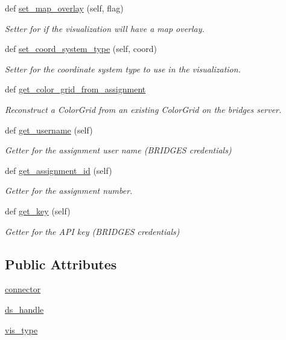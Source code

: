 \begin{DoxyCompactItemize}
def \hyperlink{classbridges_1_1bridges_1_1_bridges_ae9ed34b5878d9d120949da0b7e4d2911}{set\+\_\+map\+\_\+overlay} (self, flag)
\begin{DoxyCompactList}\small\item\em Setter for if the visualization will have a map overlay. \end{DoxyCompactList}\item 
def \hyperlink{classbridges_1_1bridges_1_1_bridges_a6bc905490b1995234f88f47af9aa8a17}{set\+\_\+coord\+\_\+system\+\_\+type} (self, coord)
\begin{DoxyCompactList}\small\item\em Setter for the coordinate system type to use in the visualization. \end{DoxyCompactList}\item 
def \hyperlink{classbridges_1_1bridges_1_1_bridges_a11c2be346fba56589955894c5f84747d}{get\+\_\+color\+\_\+grid\+\_\+from\+\_\+assignment}
\begin{DoxyCompactList}\small\item\em Reconstruct a Color\+Grid from an existing Color\+Grid on the bridges server. \end{DoxyCompactList}\item 
def \hyperlink{classbridges_1_1bridges_1_1_bridges_abf6fdb19db336c2ed14987fdd89d65fe}{get\+\_\+username} (self)
\begin{DoxyCompactList}\small\item\em Getter for the assignment user name (B\+R\+I\+D\+G\+ES credentials) \end{DoxyCompactList}\item 
def \hyperlink{classbridges_1_1bridges_1_1_bridges_a94f39f11368031ad33800aac0bac2f7d}{get\+\_\+assignment\+\_\+id} (self)
\begin{DoxyCompactList}\small\item\em Getter for the assignment number. \end{DoxyCompactList}\item 
def \hyperlink{classbridges_1_1bridges_1_1_bridges_afcdb0291c535b41fb7be31eaf5bf3677}{get\+\_\+key} (self)
\begin{DoxyCompactList}\small\item\em Getter for the A\+PI key (B\+R\+I\+D\+G\+ES credentials) \end{DoxyCompactList}\end{DoxyCompactItemize}
\subsection*{Public Attributes}
\begin{DoxyCompactItemize}
\item 
\hyperlink{classbridges_1_1bridges_1_1_bridges_a1c02ee44e7a4a3ee2f7d9c7d7da7d09f}{connector}
\item 
\hyperlink{classbridges_1_1bridges_1_1_bridges_a7a6f25612be64d4f3e203d7d37cb4da4}{ds\+\_\+handle}
\item 
\hyperlink{classbridges_1_1bridges_1_1_bridges_a5ca152bf3830e2be1f72247463916f82}{vis\+\_\+type}
\end{DoxyCompactItemize}



